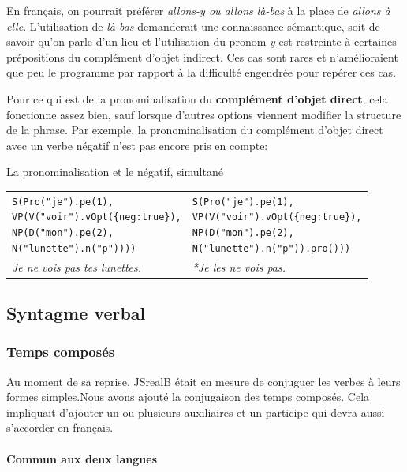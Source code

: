 \documentclass[11pt]{article} %
\newcommand{\system}[1]{\textsf{#1}}
\newcommand{\JSB}{\system{JSrealB}}
\newcommand{\real}[1]{\emph{#1}}
\begin{document}
En français, on pourrait préférer \emph{allons-y ou allons
là-bas} à la place de \emph{allons à elle}. L'utilisation de \emph{là-bas} demanderait une connaissance sémantique,
soit de savoir qu'on parle d'un lieu et l'utilisation du pronom \emph{y}
est restreinte à certaines prépositions du complément d'objet indirect.
Ces cas sont rares et n'amélioraient que peu le programme par rapport à la difficulté
engendrée pour repérer ces cas. 

Pour ce qui est de la pronominalisation du \textbf{complément d'objet
direct}, cela fonctionne assez bien, sauf lorsque d'autres options viennent
modifier la structure de la phrase. Par exemple, la pronominalisation du complément
d'objet direct avec un verbe négatif n'est pas encore pris en compte:\\
\begin{example}
\centering
\caption{La pronominalisation et le négatif, simultané}
\begin{tabular}{p{8cm} p{8cm}}
\begin{alltt}
S(Pro("je").pe(1),
  VP(V("voir").vOpt(\{neg:true\}),
     NP(D("mon").pe(2),
        N("lunette").n("p"))))
\end{alltt} &
\begin{alltt}
S(Pro("je").pe(1),
  VP(V("voir").vOpt(\{neg:true\}),
     NP(D("mon").pe(2),
        N("lunette").n("p")).pro()))
\end{alltt} \\
\real{Je ne vois pas tes lunettes.} & \real{*Je les ne vois pas.}
\end{tabular}
\end{example}

\subsection{Syntagme verbal}

\subsubsection{Temps composés}

Au moment de sa reprise, \JSB{} était en mesure de conjuguer les
verbes à leurs formes simples.Nous avons ajouté la conjugaison des temps composés.
Cela impliquait d'ajouter un ou plusieurs auxiliaires et un participe qui devra
aussi s'accorder en français.

\paragraph{Commun aux deux langues}
\end{document}

